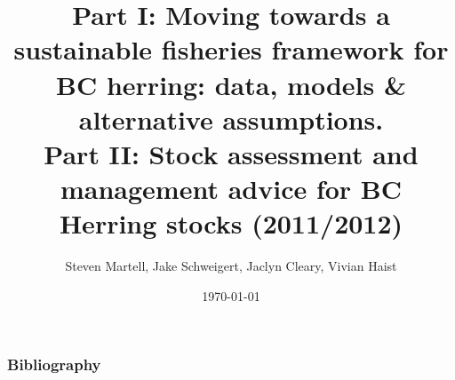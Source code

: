 \documentclass{beamer}
\title[2011 BC Herring Assessment]{Part I: Moving towards a sustainable fisheries framework for BC herring: data, models \& alternative assumptions.\\
\vfill
Part II: Stock assessment and management advice for BC Herring stocks (2011/2012)\\}
\author{Steven Martell, Jake Schweigert, Jaclyn Cleary, Vivian Haist}
\institute[UBC]
{
University of British Columbia \\
\medskip
{\emph{martell.steve@gmail.com}}
}
\date{\today}
\begin{document}
	\def\newblock{\hskip .11em plus .33em minus .07em}
%
\begin{frame}
\titlepage
\end{frame}
%





\begin{frame}[t]\frametitle{Bibliography}
	\def\newblock{\hskip .11em plus .33em minus .07em}
	
		
\end{frame}
%



\end{document}
